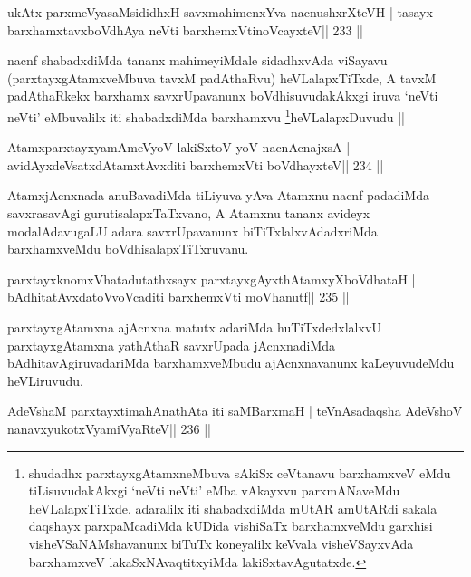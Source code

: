 \begin{shl}
ukAtx parxmeVyasaMsididhxH savxmahimenxYva nacnushxrXteVH |
tasayx barxhamxtavxboVdhAya neVti barxhemxVtinoVcayxteV\hfill || 233 ||
\end{shl}

\begin{artha}
nacnf shabadxdiMda tananx mahimeyiMdale sidadhxvAda viSayavu
(parxtayxgAtamxveMbuva tavxM padAthaRvu) heVLalapxTiTxde, A
tavxM padAthaRkekx barxhamx savxrUpavanunx boVdhisuvudakAkxgi iruva
`neVti neVti' eMbuvalilx iti shabadxdiMda
barxhamxvu \footnote[2]{shudadhx parxtayxgAtamxneMbuva sAkiSx
  ceVtanavu barxhamxveV eMdu tiLisuvudakAkxgi `neVti neVti' eMba
  vAkayxvu parxmANaveMdu heVLalapxTiTxde. adaralilx iti shabadxdiMda
  mUtAR amUtARdi sakala daqshayx parxpaMcadiMda kUDida vishiSaTx
  barxhamxveMdu garxhisi visheVSaNAMshavanunx biTuTx koneyalilx
  keVvala visheVSayxvAda barxhamxveV lakaSxNAvaqtitxyiMda lakiSxtavAgutatxde.}heVLalapxDuvudu ||
\end{artha}

\begin{shl}
AtamxparxtayxyamAmeVyoV lakiSxtoV yoV nacnA\s cnajxsA |
avidAyxdeVsatxdAtamxtAvxditi barxhemxVti boVdhayxteV\hfill || 234 ||
\end{shl}

\begin{artha}
AtamxjAcnxnada anuBavadiMda tiLiyuva yAva Atamxnu nacnf padadiMda savxrasavAgi gurutisalapxTaTxvano, A Atamxnu tananx avideyx modalAdavugaLU adara savxrUpavanunx biTiTxlalxvAdadxriMda barxhamxveMdu boVdhisalapxTiTxruvanu.
\end{artha}

\begin{shl}
parxtayxknomxVhatadutathxsayx parxtayxgAyxthAtamxyXboVdhataH |
bAdhitatAvxdatoV\s voVcaditi barxhemxVti moVhanutf\hfill || 235 ||
\end{shl}

\begin{artha}
parxtayxgAtamxna ajAcnxna matutx adariMda huTiTxdedxlalxvU parxtayxgAtamxna yathAthaR savxrUpada jAcnxnadiMda bAdhitavAgiruvadariMda barxhamxveMbudu ajAcnxnavanunx kaLeyuvudeMdu heVLiruvudu.
\end{artha}


\begin{shl}
\footnotemark[1]AdeVshaM parxtayxtimahAnathAta iti saMBarxmaH |
teVnAsadaqsha AdeVshoV nanavxyukotxV\s yamiVyaRteV\hfill || 236 ||
\end{shl}


